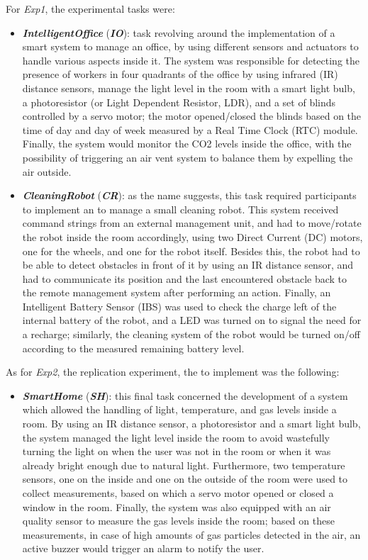 For \textit{Exp1}, the experimental tasks were:
\begin{itemize}
    \item \textbf{\textit{IntelligentOffice}} (\textbf{\textit{IO}}): task revolving around the implementation of a smart system to manage an office, by using different sensors and actuators to handle various aspects inside it. The system was responsible for detecting the presence of workers in four quadrants of the office by using infrared (IR) distance sensors, manage the light level in the room with a smart light bulb, a photoresistor (or Light Dependent Resistor, LDR), and a set of blinds controlled by a servo motor; the motor opened/closed the blinds based on the time of day and day of week measured by a Real Time Clock (RTC) module. Finally, the system would monitor the CO2 levels inside the office, with the possibility of triggering an air vent system to balance them by expelling the air outside.

    \item \textbf{\textit{CleaningRobot}} (\textbf{\textit{CR}}): as the name suggests, this task required participants to implement an \es to manage a small cleaning robot. This system received command strings from an external management unit, and had to move/rotate the robot inside the room accordingly, using two Direct Current (DC) motors, one for the wheels, and one for the robot itself. Besides this, the robot had to be able to detect obstacles in front of it by using an IR distance sensor, and had to communicate its position and the last encountered obstacle back to the remote management system after performing an action. Finally, an Intelligent Battery Sensor (IBS) was used to check the charge left of the internal battery of the robot, and a LED was turned on to signal the need for a recharge; similarly, the cleaning system of the robot would be turned on/off according to the measured remaining battery level.
\end{itemize}

As for \textit{Exp2}, the replication experiment, the \es to implement was the following:
\begin{itemize}
    \item \textbf{\textit{SmartHome}} (\textbf{\textit{SH}}): this final task concerned the development of a system which allowed the handling of light, temperature, and gas levels inside a room. By using an IR distance sensor, a photoresistor and a smart light bulb, the system managed the light level inside the room to avoid wastefully turning the light on when the user was not in the room or when it was already bright enough due to natural light. Furthermore, two temperature sensors, one on the inside and one on the outside of the room were used to collect measurements, based on which a servo motor opened or closed a window in the room. Finally, the system was also equipped with an air quality sensor to measure the gas levels inside the room; based on these measurements, in case of high amounts of gas particles detected in the air, an active buzzer would trigger an alarm to notify the user.
\end{itemize}

